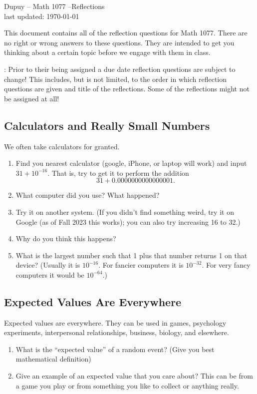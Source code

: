 \documentclass[]{article}
\numberwithin{equation}{section}
\theoremstyle{definition}
\theoremstyle{remark}
\begin{document}
	
\begin{center}
	{\Large \sc Dupuy -- Math 1077  --Reflections }\\
	last updated: \today
\end{center}

\noindent This document contains all of the reflection questions for Math 1077. 
There are no right or wrong answers to these questions. They are intended to get you thinking about a certain topic before we engage with them in class.
\vspace{1em}

: Prior to their being assigned a due date reflection questions are subject to change! This includes, but is not limited, to the order in which reflection questions are given and title of the reflections. Some of the reflections might not be assigned at all!

\tableofcontents

\newpage

\subsection{Calculators and Really Small Numbers }
We often take calculators for granted. 
\begin{enumerate}
\item Find you nearest calculator (google, iPhone, or laptop will work) and input $31+10^{-16}$. That is, try to get it to perform the addition 
$$31 + 0.0000000000000001.$$
\item  What computer did you use? What happened? 
\item Try it on another system. (If you didn't find something weird, try it on Google (as of Fall 2023 this works); you can also try increasing 16 to 32.)
\item Why do you think this happens?
\item What is the largest number such that 1 plus that number returns 1 on that device?  (Usually it is $10^{-16}$. For fancier computers it is $10^{-32}$. For very fancy computers it would be $10^{-64}$.)
\end{enumerate}



\subsection{Expected Values Are Everywhere }
Expected values are everywhere.
They can be used in games, psychology experiments, interpersonal relationships, business, biology, and elsewhere. 
\begin{enumerate}
	\item What is the ``expected value'' of a random event? (Give you best mathematical definition)
	\item Give an example of an expected value that you care about? This can be from a game you play or from something you like to collect or anything really. 
\end{enumerate}
\end{document}
